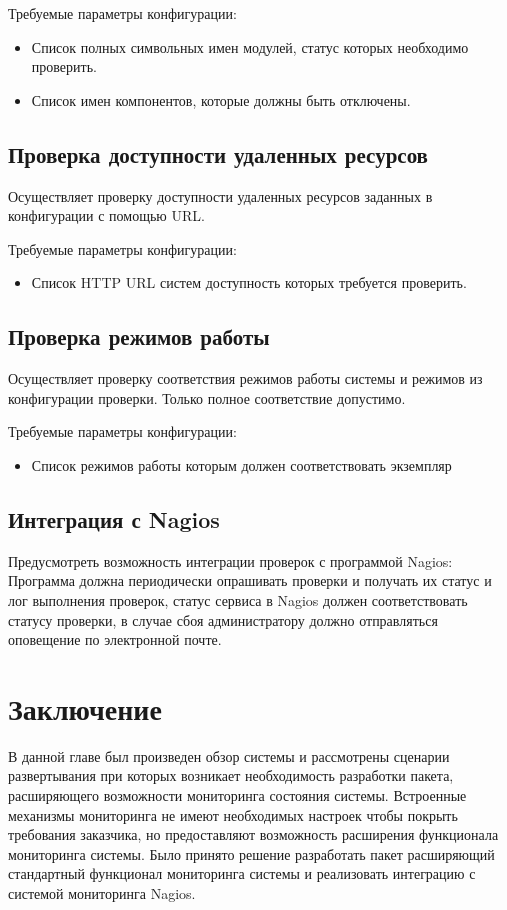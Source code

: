 Требуемые параметры конфигурации:
\begin{itemize}
\item Список полных символьных имен модулей, статус которых необходимо проверить.
\item Список имен компонентов, которые должны быть отключены.
\end{itemize}

\subsection{Проверка доступности удаленных ресурсов}
Осуществляет проверку доступности удаленных ресурсов заданных в конфигурации с помощью URL.

Требуемые параметры конфигурации:
\begin{itemize}
\item Список HTTP URL систем доступность которых требуется проверить.
\end{itemize}

\subsection{Проверка режимов работы}
Осуществляет проверку соответствия режимов работы системы и режимов из конфигурации проверки. Только полное соответствие допустимо.

Требуемые параметры конфигурации:
\begin{itemize}
\item Список режимов работы которым должен соответствовать экземпляр
\end{itemize}

\subsection{Интеграция с Nagios}
Предусмотреть возможность интеграции проверок с программой Nagios: Программа должна периодически опрашивать проверки и получать их статус и лог выполнения проверок, статус сервиса в Nagios должен соответствовать статусу проверки, в случае сбоя администратору должно отправляться оповещение по электронной почте.

\section{Заключение}
В данной главе был произведен обзор системы и рассмотрены сценарии развертывания при которых возникает необходимость разработки пакета, расширяющего возможности мониторинга состояния системы. Встроенные механизмы мониторинга не имеют необходимых настроек чтобы покрыть требования заказчика, но предоставляют возможность расширения функционала мониторинга системы. Было принято решение разработать пакет расширяющий стандартный функционал мониторинга системы и реализовать интеграцию с системой мониторинга Nagios.


